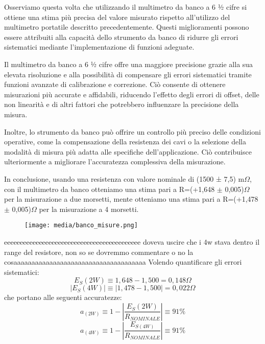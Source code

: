 Osserviamo questa volta che utilizzando il multimetro da banco a 6 ½ cifre si ottiene una stima più precisa del valore misurato rispetto all'utilizzo del multimetro portatile descritto precedentemente. Questi miglioramenti possono essere attribuiti alla capacità dello strumento da banco di ridurre gli errori sistematici mediante l'implementazione di funzioni adeguate.

Il multimetro da banco a 6 ½ cifre offre una maggiore precisione grazie alla sua elevata risoluzione e alla possibilità di compensare gli errori sistematici tramite funzioni avanzate di calibrazione e correzione. Ciò consente di ottenere misurazioni più accurate e affidabili, riducendo l'effetto degli errori di offset, delle non linearità e di altri fattori che potrebbero influenzare la precisione della misura.

Inoltre, lo strumento da banco può offrire un controllo più preciso delle condizioni operative, come la compensazione della resistenza dei cavi o la selezione della modalità di misura più adatta alle specifiche dell'applicazione. Ciò contribuisce ulteriormente a migliorare l'accuratezza complessiva della misurazione.

In conclusione, usando una resistenza con valore nominale di (1500 ± 7,5) m$\Omega$, con il multimetro da banco otteniamo una stima pari a R=(+1,648 $\pm$ 0,005)$\Omega$ per la misurazione a due morsetti, mente otteniamo una stima pari a R=(+1,478 $\pm$ 0,005)$\Omega$ per la misurazione a 4 morsetti.

\begin{figure}[h]
    \centering
    \texttt{[image: media/banco\_misure.png]}
    \label{fig:range}
\end{figure}

eeeeeeeeeeeeeeeeeeeeeeeeeeeeeeeeeeeeeeeeeee doveva uscire che i 4w stava dentro il range del resistore, non so se dovremmo commentare o no la cosaaaaaaaaaaaaaaaaaaaaaaaaaaaaaaaaaaaaa
\newline
Volendo quantificare gli errori sistematici:
\begin{equation}
    E_S(2W) \equiv 1,648 - 1,500 = 0,148 \Omega
\end{equation}
\begin{equation}
    | E_S(4W) | \equiv | 1,478 - 1,500  |= 0,022 \Omega
\end{equation}
che portano alle seguenti accuratezze: 
\begin{equation}
    a_(2W) \equiv 1 - | \frac{E_S(2W)}{R_{NOMINALE}} | \equiv 91\%
\end{equation}
\begin{equation}
    a_(4W) \equiv 1 - | \frac{E_{S(4W)}}{R_{NOMINALE}} | \equiv 91\%
\end{equation}

